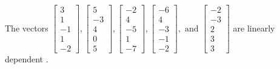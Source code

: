 \begin{exercise}
\begin{exerciseStatement}
  \end{exerciseStatement}
  \begin{exerciseAnswer}
   The vectors \(\left[\begin{array}{r}
3 \\
1 \\
-1 \\
1 \\
-2
\end{array}\right] , \left[\begin{array}{r}
5 \\
-3 \\
4 \\
0 \\
5
\end{array}\right] , \left[\begin{array}{r}
-2 \\
4 \\
-5 \\
1 \\
-7
\end{array}\right] , \left[\begin{array}{r}
-6 \\
4 \\
-3 \\
-1 \\
-2
\end{array}\right] , \text{ and } \left[\begin{array}{r}
-2 \\
-3 \\
2 \\
3 \\
3
\end{array}\right]\) are 
  	 linearly dependent  .
  


  \end{exerciseAnswer}
\end{exercise}